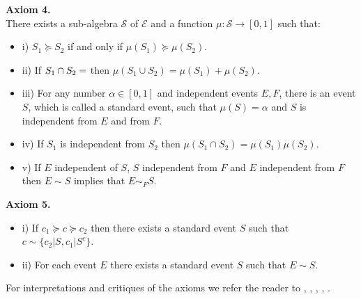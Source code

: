 \documentclass[11pt]{article}
\theoremstyle{plain}
\begin{document}
	\textbf{Axiom 4.}\\
	There exists a sub-algebra $\mathcal{S}$ of $\mathcal{E}$ and a function $\mu : \mathcal{S} \to [0,1]$ such that:
	\begin{itemize}
	\item i) $S_1 \succeq S_2$ if and only if $\mu(S_1) \succeq \mu(S_2)$.
	\item ii) If $S_1 \cap S_2 = \empty$ then $\mu(S_1 \cup S_2) = \mu(S_1) + \mu(S_2)$.
	\item iii) For any number $\alpha \in [0,1]$ and independent events $E,F$, there is an event $S$, which is called a standard event, such that $\mu(S)=\alpha$ and $S$ is independent from $E$ and from $F$.
	\item iv) If $S_1$ is independent from $S_2$ then $\mu(S_1 \cap S_2)=\mu(S_1)\mu(S_2)$.
	\item v) If $E$ independent of $S$, $S$ independent from $F$ and $E$ independent from $F$ then $E \sim S$ implies that $E \sim_F S$.
	\end{itemize}
	
	\textbf{Axiom 5.}
	\begin{itemize}
	\item i) If $c_1 \succeq c \succeq c_2$ then there exists a standard event $S$ such that $c \sim \{ c_2 | S, c_1 | S^c \}$.
	\item ii) For each event $E$ there exists a standard event $S$ such that $E \sim S$.
	\end{itemize}
	
	For interpretations and critiques of the axioms we refer the reader to \cite{bernardo2000bayesian}, \cite{binmore2008rational}, \cite{gilboa2009decision}, \cite{wakker2010prospect}, \cite{peterson2017introduction}.
\end{document}
